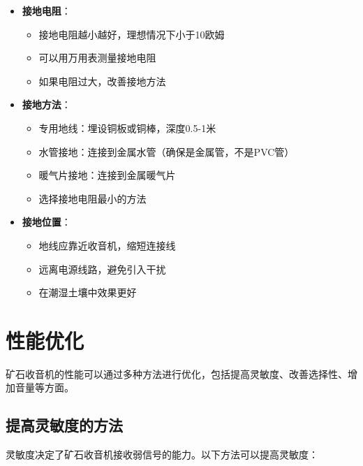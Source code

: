 \documentclass[12pt,UTF8]{ctexbook}
\begin{document}
\begin{itemize}[leftmargin=3.5em]
    \item \textbf{接地电阻}：
        \begin{itemize}[leftmargin=3.5em]
            \item 接地电阻越小越好，理想情况下小于10欧姆
            \item 可以用万用表测量接地电阻
            \item 如果电阻过大，改善接地方法
        \end{itemize}
    \item \textbf{接地方法}：
        \begin{itemize}[leftmargin=3.5em]
            \item 专用地线：埋设铜板或铜棒，深度0.5-1米
            \item 水管接地：连接到金属水管（确保是金属管，不是PVC管）
            \item 暖气片接地：连接到金属暖气片
            \item 选择接地电阻最小的方法
        \end{itemize}
    \item \textbf{接地位置}：
        \begin{itemize}[leftmargin=3.5em]
            \item 地线应靠近收音机，缩短连接线
            \item 远离电源线路，避免引入干扰
            \item 在潮湿土壤中效果更好
        \end{itemize}
\end{itemize}

\section{性能优化}

矿石收音机的性能可以通过多种方法进行优化，包括提高灵敏度、改善选择性、增加音量等方面。

\subsection{提高灵敏度的方法}

灵敏度决定了矿石收音机接收弱信号的能力。以下方法可以提高灵敏度：
\end{document}

